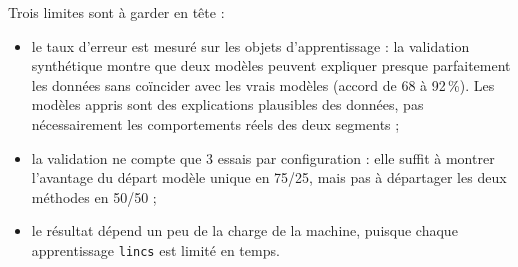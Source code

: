 \documentclass[11pt,a4paper]{article}
\begin{document}
Trois limites sont à garder en tête :
\begin{itemize}
  \item le taux d'erreur est mesuré sur les objets d'apprentissage : la validation synthétique montre que deux
        modèles peuvent expliquer presque parfaitement les données sans coïncider avec les vrais modèles (accord
        de 68 à 92\,\%). Les modèles appris sont des explications plausibles des données, pas nécessairement
        les comportements réels des deux segments ;
  \item la validation ne compte que 3 essais par configuration : elle suffit à montrer l'avantage du départ
        modèle unique en 75/25, mais pas à départager les deux méthodes en 50/50 ;
  \item le résultat dépend un peu de la charge de la machine, puisque chaque apprentissage \texttt{lincs} est
        limité en temps.
\end{itemize}
\end{document}
